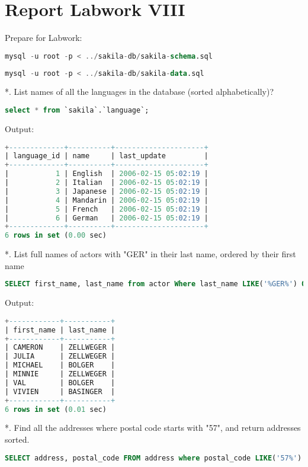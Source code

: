\documentclass[12pt]{report}
\begin{document}
\section*{Report Labwork VIII}


Prepare for Labwork:

{\small
{}}

\begin{lstlisting}[language=sql]
mysql -u root -p < ../sakila-db/sakila-schema.sql 
\end{lstlisting}

{\small
{}}
\begin{lstlisting}[language=sql]
mysql -u root -p < ../sakila-db/sakila-data.sql 
\end{lstlisting}

*. List names of all the languages in the database (sorted alphabetically)?
\begin{lstlisting}[language=sql]
select * from `sakila`.`language`;
\end{lstlisting}
Output:
\begin{lstlisting}[language=sql]
+-------------+----------+---------------------+
| language_id | name     | last_update         |
+-------------+----------+---------------------+
|           1 | English  | 2006-02-15 05:02:19 |
|           2 | Italian  | 2006-02-15 05:02:19 |
|           3 | Japanese | 2006-02-15 05:02:19 |
|           4 | Mandarin | 2006-02-15 05:02:19 |
|           5 | French   | 2006-02-15 05:02:19 |
|           6 | German   | 2006-02-15 05:02:19 |
+-------------+----------+---------------------+
6 rows in set (0.00 sec)
\end{lstlisting}

*. List full names of actors with "GER" in their last name, ordered by their first name
\begin{lstlisting}[language=sql]
SELECT first_name, last_name from actor Where last_name LIKE('%GER%') ORDER BY first_name;
\end{lstlisting}
Output:
\begin{lstlisting}[language=sql]
+------------+-----------+
| first_name | last_name |
+------------+-----------+
| CAMERON    | ZELLWEGER |
| JULIA      | ZELLWEGER |
| MICHAEL    | BOLGER    |
| MINNIE     | ZELLWEGER |
| VAL        | BOLGER    |
| VIVIEN     | BASINGER  |
+------------+-----------+
6 rows in set (0.01 sec)
\end{lstlisting}

*. Find all the addresses where postal code starts with "57", and return addresses sorted.
\begin{lstlisting}[language=sql]
SELECT address, postal_code FROM address where postal_code LIKE('57%') ORDER BY address;
\end{lstlisting}
\end{document}
